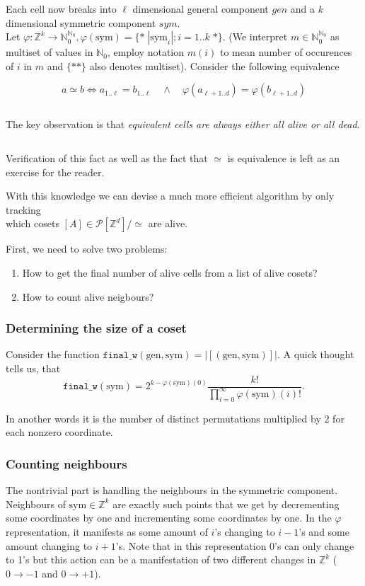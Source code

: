 \documentclass[]{article}
\newcommand{\NN}{\mathbb N}
\newcommand{\ZZ}{\mathbb Z}
\newcommand{\calP}{\mathcal P}
\newcommand{\finalw}{\texttt{final\_w}}
\newcommand{\sym}{\mathrm{sym}}
\newcommand{\gen}{\mathrm{gen}}
\begin{document}
	Each cell now breaks into $\ell$ dimensional general component $gen$ and a $k$ dimensional symmetric component $sym$.\\
	Let $\varphi: \ZZ^k \to \NN_0^{\NN_0}, \varphi(\sym) = \{*\;|\sym_i|; i = 1..k\; *\}$. (We interpret $m \in \NN_0^{\NN_0}$ as multiset of values in $\NN_0$, employ notation $m(i)$ to mean number of occurences of $i$ in $m$ and $\{**\}$ also denotes multiset).
	Consider the following equivalence
	
	
	$$a \simeq b \iff a_{1..\ell} = b_{1..\ell} \quad\land\quad \varphi(a_{\ell+1..d}) = \varphi(b_{\ell+1..d})$$
	
	$ $
	
	The key observation is that \emph{equivalent cells are always either all alive or all dead}.
	
	$ $
	
	Verification of this fact as well as the fact that $\simeq$ is equivalence is left as an exercise for the reader.
	
	With this knowledge we can devise a much more efficient algorithm by only tracking\\which cosets $[A] \in \calP[\ZZ^d] /\simeq$ are alive.
	
	First, we need to solve two problems:
	\begin{enumerate}
		\item How to get the final number of alive cells from a list of alive cosets?
		\item How to count alive neigbours?
	\end{enumerate}

	\subsubsection{Determining the size of a coset}
	Consider the function $\finalw(\gen,\sym) = |[(\gen,\sym)]|$. A quick thought tells us, that
	$$\finalw(\sym) = 2^{k-\varphi(\sym)(0)}\frac{k!}{\prod_{i=0}^\infty \varphi(\sym)(i)!}.$$

	In another words it is the number of distinct permutations multiplied by 2 for each nonzero coordinate.
	
	\subsubsection{Counting neighbours}
	The nontrivial part is handling the neighbours in the symmetric component.
	Neighbours of $\sym \in \ZZ^k$ are exactly such points that we get by decrementing some coordinates by one and incrementing some coordinates by one. In the $\varphi$ representation, it manifests as some amount of $i$'s changing to $i-1$'s and some amount changing to $i+1$'s. Note that in this representation 0's can only change to 1's but this action can be a manifestation of two different changes in $\ZZ^k$ ($0 \to -1$ and $0 \to +1$).
	
\end{document}
